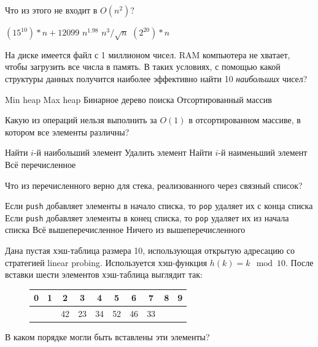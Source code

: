\documentclass[12pt]{exam}
\begin{document}
\begin{questions}

\question[1] Что из этого не входит в $O(n^2)$?
\begin{checkboxes}
\choice $(15^{10}) * n + 12099$
\choice $n^{1.98}$
\CorrectChoice $n^3 / \sqrt{n}$
\choice $(2^{20}) * n$
\end{checkboxes}

\question[3] На диске имеется файл с 1 миллионом чисел. RAM компьютера не хватает, чтобы загрузить все числа в память. В таких условиях, с помощью какой структуры данных получится наиболее эффективно найти 10 {\em наибольших} чисел?
\begin{checkboxes}
\CorrectChoice Min heap
\choice Max heap
\choice Бинарное дерево поиска
\choice Отсортированный массив
\end{checkboxes}

\question[1] Какую из операций нельзя выполнить за $O(1)$ в отсортированном массиве, в котором все элементы различны?
\begin{checkboxes}
\choice Найти $i$-й наибольший элемент
\CorrectChoice Удалить элемент
\choice Найти $i$-й наименьший элемент
\choice Всё перечисленное
\end{checkboxes}

\question[1] Что из перечисленного верно для стека, реализованного через связный список?
\begin{checkboxes}
\choice Если {\tt push} добавляет элементы в начало списка, то {\tt pop} удаляет их с конца списка
\choice Если {\tt push} добавляет элементы в конец списка, то {\tt pop} удаляет их из начала списка
\choice Всё вышеперечисленное
\CorrectChoice Ничего из вышеперечисленного
\end{checkboxes}


\question[2] Дана пустая хэш-таблица размера 10, использующая открытую адресацию со стратегией linear probing. Используется хэш-функция $h(k) = k \mod 10$. После вставки шести элементов хэш-таблица выглядит так:
\begin{figure}[H]
  \begin{center}
    \begin{tabular}{|c|c|c|c|c|c|c|c|c|c|}
    \hline
    0 & 1 & 2  & 3  & 4  & 5  & 6  & 7  & 8 & 9 \\ \hline
    ~ & ~ & 42 & 23 & 34 & 52 & 46 & 33 & ~ & ~ \\ \hline
    \end{tabular}
  \end{center}
\end{figure}
В каком порядке могли быть вставлены эти элементы?


\end{questions}
\end{document}
